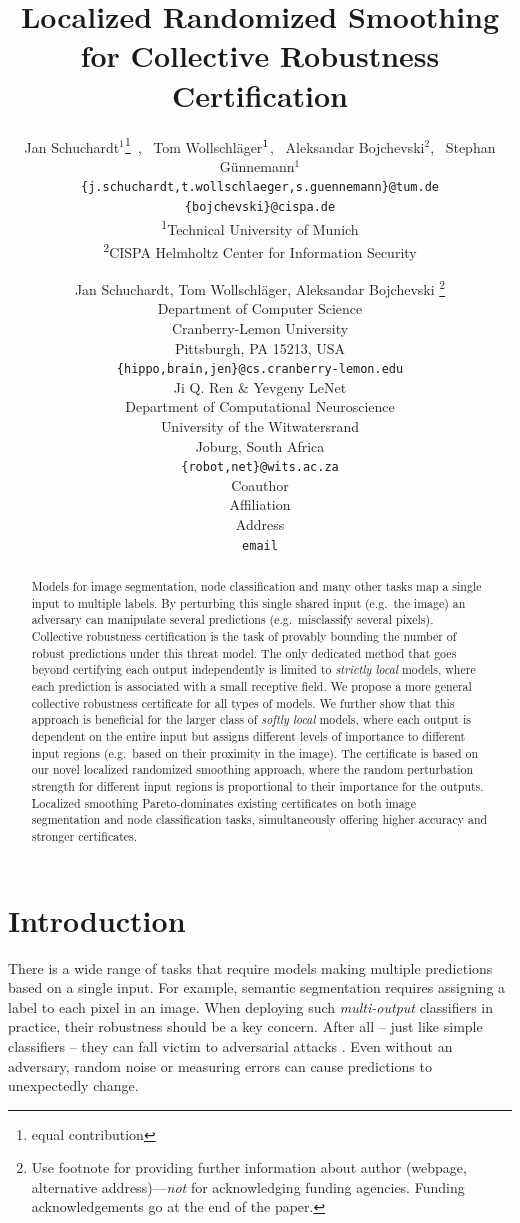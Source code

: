 \documentclass{article} %
\title{Localized Randomized Smoothing\\for Collective Robustness Certification}
\author{Jan Schuchardt$^{1}$\thanks{equal contribution}~, ~Tom Wollschl\"ager$^{1 \fnsymbol{footnote}}$, ~Aleksandar Bojchevski$^{2}$, ~Stephan G\"unnemann$^{1}$\\
\texttt{\{j.schuchardt,t.wollschlaeger,s.guennemann\}@tum.de}\\
\texttt{\{bojchevski\}@cispa.de} \\
\textsuperscript{1}Technical University of Munich \\
\textsuperscript{2}CISPA Helmholtz Center for Information Security \\
}
\author{Jan Schuchardt, Tom Wollschläger, Aleksandar Bojchevski \thanks{ Use footnote for providing further information
about author (webpage, alternative address)---\emph{not} for acknowledging
funding agencies.  Funding acknowledgements go at the end of the paper.} \\
Department of Computer Science\\
Cranberry-Lemon University\\
Pittsburgh, PA 15213, USA \\
\texttt{\{hippo,brain,jen\}@cs.cranberry-lemon.edu} \\
\And
Ji Q. Ren \& Yevgeny LeNet \\
Department of Computational Neuroscience \\
University of the Witwatersrand \\
Joburg, South Africa \\
\texttt{\{robot,net\}@wits.ac.za} \\
\AND
Coauthor \\
Affiliation \\
Address \\
\texttt{email}
}
\theoremstyle{plain}
\theoremstyle{definition}
\theoremstyle{remark}
\begin{document}
\maketitle

\begin{abstract}
Models for image segmentation, node classification and many other tasks map a single input to multiple labels.
By perturbing this single shared input (e.g.~the image) an adversary can manipulate several predictions (e.g.~misclassify several pixels).
Collective robustness certification is the task of provably bounding the number of robust predictions under this threat model.
The only dedicated method that goes beyond certifying each output independently is limited to \textit{strictly local} models, where each prediction is associated with a small receptive field.
We propose a more general collective robustness certificate for all types of models. We further show that this approach is beneficial for the larger class of \textit{softly local} models, where each output is dependent on the entire input
but assigns different levels of importance to different input regions (e.g.~based on their proximity in the image).
The certificate is based on our novel localized randomized smoothing approach, where the random perturbation strength for different input regions is proportional to their importance for the outputs.
Localized smoothing Pareto-dominates existing certificates on both image segmentation and node classification tasks, simultaneously offering higher accuracy and stronger certificates.
\end{abstract}

\section{Introduction}\label{section:introduction}
There is a wide range of tasks that require models making multiple predictions based on a single input.
For example,  semantic segmentation  requires assigning a label to each pixel in an image.
When deploying such \textit{multi-output} classifiers in practice, their robustness should be a key concern.
After all -- just like simple classifiers \citep{Szegedy2014} -- they can fall victim to adversarial attacks \citep{Xie2017, Zuegner2018,  Belinkov2018}. Even without an adversary, random noise or measuring errors can cause predictions to unexpectedly change.
\end{document}
